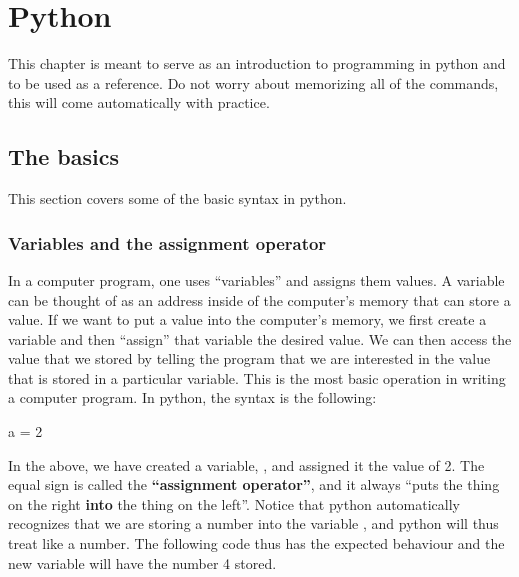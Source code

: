 %
\chapter{Python}
This chapter is meant to serve as an introduction to programming in python and to be used as a reference. Do not worry about memorizing all of the commands, this will come automatically with practice.

\section{The basics}
This section covers some of the basic syntax in python.
\subsection{Variables and the assignment operator}
In a computer program, one uses ``variables'' and assigns them values. A variable can be thought of as an address inside of the computer's memory that can store a value. If we want to put a value into the computer's memory, we first create a variable and then ``assign'' that variable the desired value. We can then access the value that we stored by telling the program that we are interested in the value that is stored in a particular variable. This is the most basic operation in writing a computer program. In python, the syntax is the following:
\begin{python}[caption=Assignment operator] 
a = 2 
\end{python}

In the above, we have created a variable, , and assigned it the value of 2. The equal sign is called the \textbf{``assignment operator''}, and it always ``puts the thing on the right \textbf{into} the thing on the left''. Notice that python automatically recognizes that we are storing a number into the variable , and python will thus treat  like a number. The following code thus has the expected behaviour and the new variable  will have the number 4 stored.


